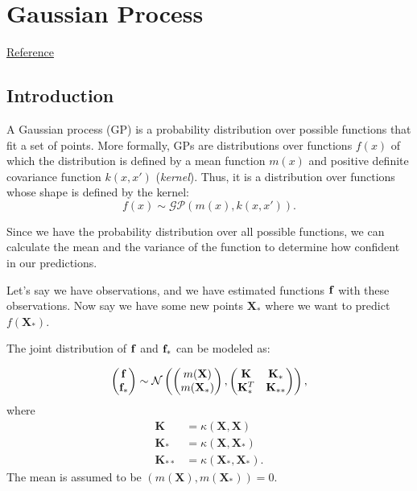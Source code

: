 \chapter{Gaussian Process}
\href{https://github.com/jwangjie/Gaussian-Process-Regression-Tutorial}{Reference}


\section{Introduction}
\label{sec:gaussian_process}
A Gaussian process (GP) is a probability distribution over possible functions that fit a set of points. More formally, GPs are distributions over functions $f(x)$ of which the distribution is defined by a mean function $m(x)$ and positive definite covariance function $k(x,x')$ (\ie \textit{kernel}). Thus, it is a distribution over functions whose shape is defined by the kernel:
$$f(x) \sim \mathcal{GP}(m(x),k(x,x')).$$

Since we have the probability distribution over all possible functions, we can calculate the mean and the variance of the function to determine how confident in our predictions.

Let's say we have observations, and we have estimated functions ${\mathbf{f}}$ with these observations. Now say we have some new points $\mathbf{X}_*$ where we want to predict $f(\mathbf{X}_*)$.

The joint distribution of ${\mathbf{f}}$ and ${\mathbf{f}}_*$ can be modeled as:

\begin{align*}
	\begin{pmatrix}
		{\mathbf{f}}\\
		{\mathbf{f}}_*
		\end{pmatrix}\sim \mathcal{N} 
		\begin{pmatrix}
		\begin{pmatrix}
			m(\mathbf{X})\\
			m(\mathbf{X}_*)
		\end{pmatrix},
		\begin{pmatrix}
			\mathbf{K} & \mathbf{K}_*\\
			\mathbf{K}_*^T & \mathbf{K}_{**}
		\end{pmatrix}
		\end{pmatrix},
\end{align*}
where 
\begin{align*}
	\mathbf{K }&= \kappa(\mathbf{X,X})\\
	\mathbf{K}_* &= \kappa(\mathbf{X},\mathbf{X}_*)\\
	\mathbf{K}_{**} &= \kappa(\mathbf{X}_*,\mathbf{X}_*).
\end{align*}
The mean is assumed to be $(m(\mathbf{X}), m(\mathbf{X}_*))=0$. 

